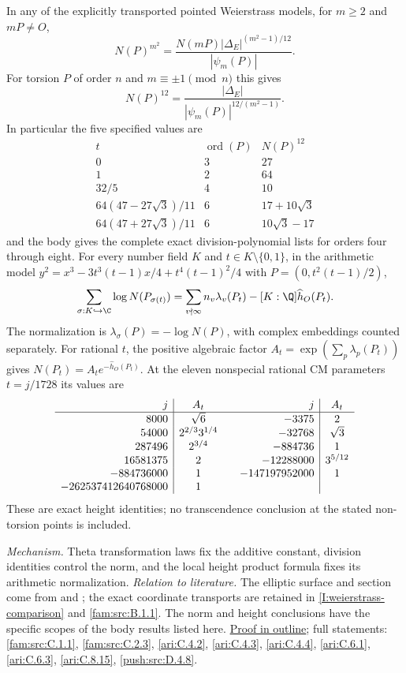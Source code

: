 In any of the explicitly transported pointed Weierstrass models,
for $m\ge2$ and $mP\ne O$,
\[
 N(P)^{m^2}=\frac{N(mP)|\Delta_E|^{(m^2-1)/12}}{|\psi_m(P)|}.
\]
For torsion $P$ of order $n$ and $m\equiv\pm1\pmod n$ this gives
\[
 N(P)^{12}=\frac{|\Delta_E|}{|\psi_m(P)|^{12/(m^2-1)}}.
\]
In particular the five specified values are
\[
\begin{array}{c|c|c}
t&\operatorname{ord}(P)&N(P)^{12}\\\hline
0&3&27\\1&2&64\\32/5&4&10\\
64(47-27\sqrt3)/11&6&17+10\sqrt3\\
64(47+27\sqrt3)/11&6&10\sqrt3-17
\end{array}
\]
and the body gives the complete exact division-polynomial lists
for orders four through eight.  For every number field $K$ and
$t\in K\setminus\{0,1\}$, in the arithmetic model
$y^2=x^3-3t^3(t-1)x/4+t^4(t-1)^2/4$ with
$P=(0,t^2(t-1)/2)$,
\[
 \sum_{\sigma:K\hookrightarrow\C}\log N(P_{\sigma(t)})
 =\sum_{v\nmid\infty}n_v\lambda_v(P_t)
       -[K:\Q]\widehat h_O(P_t).
\]
The normalization is $\lambda_\sigma(P)=-\log N(P)$, with complex
embeddings counted separately.  For rational $t$, the positive
algebraic factor $A_t=\exp(\sum_p\lambda_p(P_t))$ gives
$N(P_t)=A_t e^{-\widehat h_O(P_t)}$.  At the eleven nonspecial
rational CM parameters $t=j/1728$ its values are
\[
\begin{array}{r|c@{\qquad}r|c}
j&A_t&j&A_t\\\hline
8000&\sqrt6&-3375&2\\
54000&2^{2/3}3^{1/4}&-32768&\sqrt3\\
287496&2^{3/4}&-884736&1\\
16581375&2&-12288000&3^{5/12}\\
-884736000&1&-147197952000&1\\
-262537412640768000&1&&
\end{array}
\]
These are exact height identities; no transcendence conclusion
at the stated non-torsion points is included.

\textit{Mechanism.} Theta transformation laws fix the additive
constant, division identities control the norm, and the local
height product formula fixes its arithmetic normalization.
\textit{Relation to literature.} The elliptic surface and section
come from \cite[Remark~3.12, p.~19]{AC2026} and
\cite[Definition~2.3]{Engel2026}; the exact coordinate transports
are retained in \ref{I:weierstrass-comparison} and
\ref{fam:src:B.1.1}.  The norm and height conclusions have the
specific scopes of the body results listed here.
\hyperlink{outline-I-A}{Proof in outline}; full statements:
\ref{fam:src:C.1.1}, \ref{fam:src:C.2.3},
\ref{ari:C.4.2}, \ref{ari:C.4.3}, \ref{ari:C.4.4},
\ref{ari:C.6.1}, \ref{ari:C.6.3}, \ref{ari:C.8.15},
\ref{push:src:D.4.8}.

